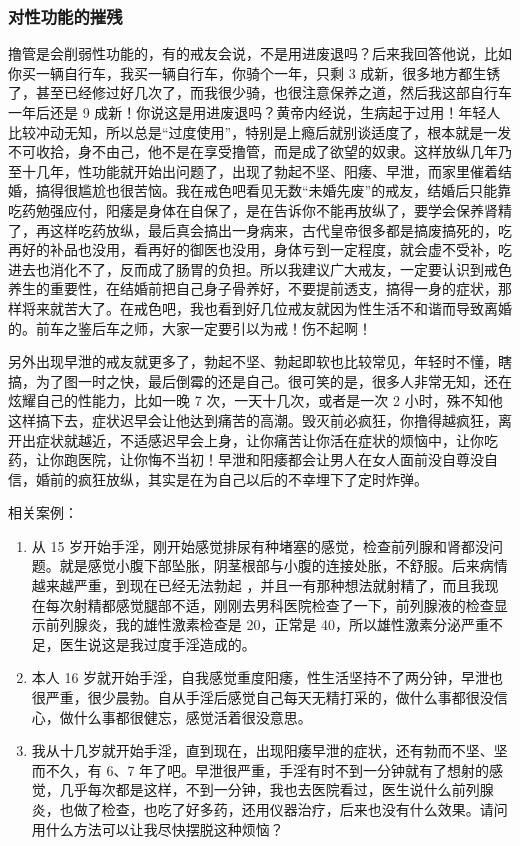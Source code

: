 \documentclass[fontset=founder]{ctexart}
\begin{document}
\subsubsection{对性功能的摧残}

撸管是会削弱性功能的，有的戒友会说，不是用进废退吗？后来我回答他说，比如你买一辆自行车，我买一辆自行车，你骑个一年，只剩 3 成新，很多地方都生锈了，甚至已经修过好几次了，而我很少骑，也很注意保养之道，然后我这部自行车一年后还是 9 成新！你说这是用进废退吗？黄帝内经说，生病起于过用！年轻人比较冲动无知，所以总是“过度使用”，特别是上瘾后就别谈适度了，根本就是一发不可收拾，身不由己，他不是在享受撸管，而是成了欲望的奴隶。这样放纵几年乃至十几年，性功能就开始出问题了，出现了勃起不坚、阳痿、早泄，而家里催着结婚，搞得很尴尬也很苦恼。我在戒色吧看见无数“未婚先废”的戒友，结婚后只能靠吃药勉强应付，阳痿是身体在自保了，是在告诉你不能再放纵了，要学会保养肾精了，再这样吃药放纵，最后真会搞出一身病来，古代皇帝很多都是搞废搞死的，吃再好的补品也没用，看再好的御医也没用，身体亏到一定程度，就会虚不受补，吃进去也消化不了，反而成了肠胃的负担。所以我建议广大戒友，一定要认识到戒色养生的重要性，在结婚前把自己身子骨养好，不要提前透支，搞得一身的症状，那样将来就苦大了。在戒色吧，我也看到好几位戒友就因为性生活不和谐而导致离婚的。前车之鉴后车之师，大家一定要引以为戒！伤不起啊！

另外出现早泄的戒友就更多了，勃起不坚、勃起即软也比较常见，年轻时不懂，瞎搞，为了图一时之快，最后倒霉的还是自己。很可笑的是，很多人非常无知，还在炫耀自己的性能力，比如一晚 7 次，一天十几次，或者是一次 2 小时，殊不知他这样搞下去，症状迟早会让他达到痛苦的高潮。毁灭前必疯狂，你撸得越疯狂，离开出症状就越近，不适感迟早会上身，让你痛苦让你活在症状的烦恼中，让你吃药，让你跑医院，让你悔不当初！早泄和阳痿都会让男人在女人面前没自尊没自信，婚前的疯狂放纵，其实是在为自己以后的不幸埋下了定时炸弹。

相关案例：

\begin{enumerate}
    \item 从 15 岁开始手淫，刚开始感觉排尿有种堵塞的感觉，检查前列腺和肾都没问题。就是感觉小腹下部坠胀，阴茎根部与小腹的连接处胀，不舒服。后来病情越来越严重，到现在已经无法勃起 ，并且一有那种想法就射精了，而且我现在每次射精都感觉腿部不适，刚刚去男科医院检查了一下，前列腺液的检查显示前列腺炎，我的雄性激素检查是 20，正常是 40，所以雄性激素分泌严重不足，医生说这是我过度手淫造成的。
    \item 本人 16 岁就开始手淫，自我感觉重度阳痿，性生活坚持不了两分钟，早泄也很严重，很少晨勃。自从手淫后感觉自己每天无精打采的，做什么事都很没信心，做什么事都很健忘，感觉活着很没意思。
    \item 我从十几岁就开始手淫，直到现在，出现阳痿早泄的症状，还有勃而不坚、坚而不久，有 6、7 年了吧。早泄很严重，手淫有时不到一分钟就有了想射的感觉，几乎每次都是这样，不到一分钟，我也去医院看过，医生说什么前列腺炎，也做了检查，也吃了好多药，还用仪器治疗，后来也没有什么效果。请问用什么方法可以让我尽快摆脱这种烦恼？
\end{enumerate}
\end{document}
